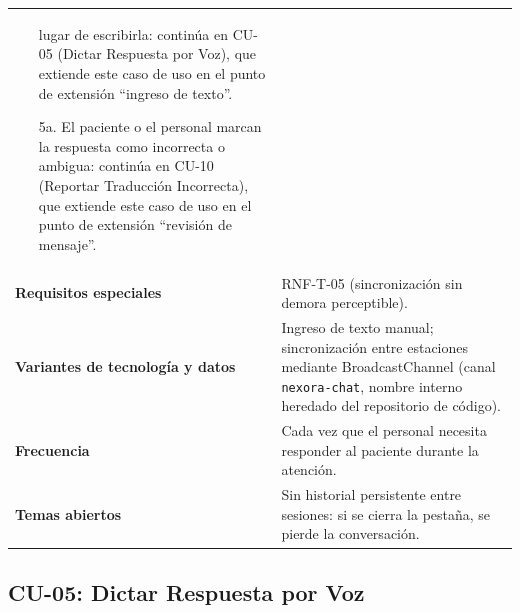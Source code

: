 \begin{longtable}{@{}>{\raggedright\arraybackslash}p{4.1cm} >{\raggedright\arraybackslash}p{\dimexpr\textwidth-4.1cm-2\tabcolsep\relax}@{}}
\begin{itemize}[leftmargin=*, itemsep=2pt]
    lugar de escribirla: continúa en CU-05 (Dictar Respuesta por Voz),
    que extiende este caso de uso en el punto de extensión ``ingreso de
    texto''.
    \item[5a.] El paciente o el personal marcan la respuesta como
    incorrecta o ambigua: continúa en CU-10 (Reportar Traducción
    Incorrecta), que extiende este caso de uso en el punto de extensión
    ``revisión de mensaje''.
\end{itemize} \\
\textbf{Requisitos especiales} & RNF-T-05 (sincronización sin demora perceptible). \\
\textbf{Variantes de tecnología y datos} &
Ingreso de texto manual; sincronización entre estaciones mediante
BroadcastChannel (canal \texttt{nexora-chat}, nombre interno heredado del
repositorio de código). \\
\textbf{Frecuencia} &
Cada vez que el personal necesita responder al paciente durante la
atención. \\
\textbf{Temas abiertos} &
Sin historial persistente entre sesiones: si se cierra la pestaña, se
pierde la conversación. \\
\bottomrule
\end{longtable}

\subsection{CU-05: Dictar Respuesta por Voz}

